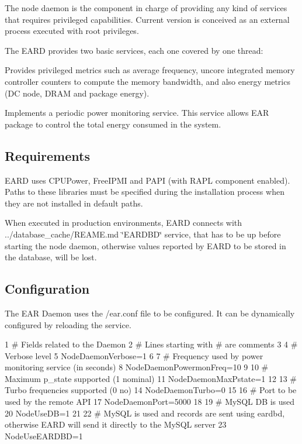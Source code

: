 The node daemon is the component in charge of providing any kind of services that requires privileged capabilities. Current version is conceived as an external process executed with root privileges.

The E\+A\+RD provides two basic services, each one covered by one thread\+:
\begin{DoxyItemize}
\item Provides privileged metrics such as average frequency, uncore integrated memory controller counters to compute the memory bandwidth, and also energy metrics (DC node, D\+R\+AM and package energy).
\item Implements a periodic power monitoring service. This service allows E\+AR package to control the total energy consumed in the system.
\end{DoxyItemize}

\subsection*{Requirements }

E\+A\+RD uses C\+P\+U\+Power, Free\+I\+P\+MI and P\+A\+PI (with R\+A\+PL component enabled). Paths to these libraries must be specified during the installation process when they are not installed in default paths.

When executed in production environments, E\+A\+RD connects with ../database\+\_\+cache/\+R\+E\+A\+ME.md \char`\"{}\+E\+A\+R\+D\+B\+D\char`\"{} service, that has to be up before starting the node daemon, otherwise values reported by E\+A\+RD to be stored in the database, will be lost.

\subsection*{Configuration }

The E\+AR Daemon uses the {\ttfamily /ear.conf} file to be configured. It can be dynamically configured by reloading the service.


\begin{DoxyCode}
1 # Fields related to the Daemon
2 # Lines starting with # are comments
3 
4 # Verbose level
5 NodeDaemonVerbose=1
6 
7 # Frequency used by power monitoring service (in seconds)
8 NodeDaemonPowermonFreq=10
9 
10 # Maximum p\_state supported (1 nominal)
11 NodeDaemonMaxPstate=1
12 
13 # Turbo frequencies supported (0 no)
14 NodeDaemonTurbo=0
15 
16 # Port to be used by the remote API
17 NodeDaemonPort=5000
18 
19 # MySQL DB is used
20 NodeUseDB=1
21 
22 # MySQL is used and records are sent using eardbd, otherwise EARD will send it directly to the MySQL server
23 NodeUseEARDBD=1
\end{DoxyCode}


